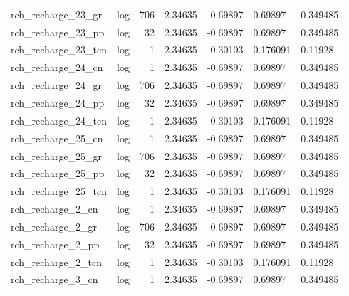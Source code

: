 \documentclass{article}
\begin{document}
\begin{center}
\begin{landscape}
\begin{longtable}{llrllll}
 rch\_recharge\_23\_gr &       log &    706 &        2.34635 &            -0.69897 &            0.69897 &           0.349485 \\
 rch\_recharge\_23\_pp &       log &     32 &        2.34635 &            -0.69897 &            0.69897 &           0.349485 \\
rch\_recharge\_23\_tcn &       log &      1 &        2.34635 &            -0.30103 &           0.176091 &            0.11928 \\
 rch\_recharge\_24\_cn &       log &      1 &        2.34635 &            -0.69897 &            0.69897 &           0.349485 \\
 rch\_recharge\_24\_gr &       log &    706 &        2.34635 &            -0.69897 &            0.69897 &           0.349485 \\
 rch\_recharge\_24\_pp &       log &     32 &        2.34635 &            -0.69897 &            0.69897 &           0.349485 \\
rch\_recharge\_24\_tcn &       log &      1 &        2.34635 &            -0.30103 &           0.176091 &            0.11928 \\
 rch\_recharge\_25\_cn &       log &      1 &        2.34635 &            -0.69897 &            0.69897 &           0.349485 \\
 rch\_recharge\_25\_gr &       log &    706 &        2.34635 &            -0.69897 &            0.69897 &           0.349485 \\
 rch\_recharge\_25\_pp &       log &     32 &        2.34635 &            -0.69897 &            0.69897 &           0.349485 \\
rch\_recharge\_25\_tcn &       log &      1 &        2.34635 &            -0.30103 &           0.176091 &            0.11928 \\
  rch\_recharge\_2\_cn &       log &      1 &        2.34635 &            -0.69897 &            0.69897 &           0.349485 \\
  rch\_recharge\_2\_gr &       log &    706 &        2.34635 &            -0.69897 &            0.69897 &           0.349485 \\
  rch\_recharge\_2\_pp &       log &     32 &        2.34635 &            -0.69897 &            0.69897 &           0.349485 \\
 rch\_recharge\_2\_tcn &       log &      1 &        2.34635 &            -0.30103 &           0.176091 &            0.11928 \\
  rch\_recharge\_3\_cn &       log &      1 &        2.34635 &            -0.69897 &            0.69897 &           0.349485 \\

\end{longtable}
\end{landscape}
\end{center}
\end{document}
